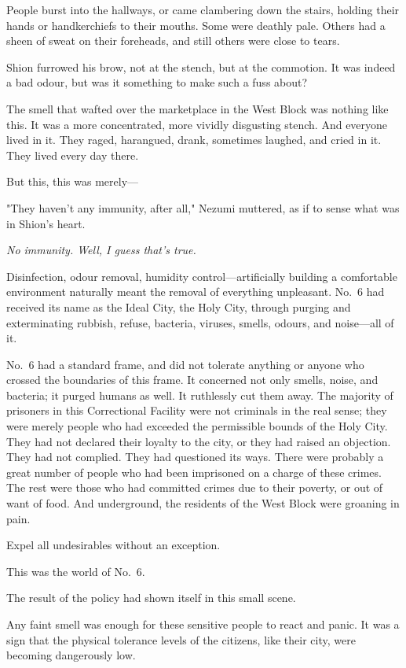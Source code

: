 People burst into the hallways, or came clambering down the stairs,
holding their hands or handkerchiefs to their mouths. Some were deathly
pale. Others had a sheen of sweat on their foreheads, and still others
were close to tears.

Shion furrowed his brow, not at the stench, but at the commotion. It was
indeed a bad odour, but was it something to make such a fuss about?

The smell that wafted over the marketplace in the West Block was nothing
like this. It was a more concentrated, more vividly disgusting stench.
And everyone lived in it. They raged, harangued, drank, sometimes
laughed, and cried in it. They lived every day there.

But this, this was merely---

"They haven't any immunity, after all," Nezumi muttered, as if to sense
what was in Shion's heart.

\emph{No immunity. Well, I guess that's true.}

Disinfection, odour removal, humidity control---artificially building a
comfortable environment naturally meant the removal of everything
unpleasant. No.~6 had received its name as the Ideal City, the Holy
City, through purging and exterminating rubbish, refuse, bacteria,
viruses, smells, odours, and noise---all of it.

No.~6 had a standard frame, and did not tolerate anything or anyone who
crossed the boundaries of this frame. It concerned not only smells,
noise, and bacteria; it purged humans as well. It ruthlessly cut them
away. The majority of prisoners in this Correctional Facility were not
criminals in the real sense; they were merely people who had exceeded
the permissible bounds of the Holy City. They had not declared their
loyalty to the city, or they had raised an objection. They had not
complied. They had questioned its ways. There were probably a great
number of people who had been imprisoned on a charge of these crimes.
The rest were those who had committed crimes due to their poverty, or
out of want of food. And underground, the residents of the West Block
were groaning in pain.

Expel all undesirables without an exception.

This was the world of No.~6.

The result of the policy had shown itself in this small scene.

Any faint smell was enough for these sensitive people to react and
panic. It was a sign that the physical tolerance levels of the citizens,
like their city, were becoming dangerously low.

